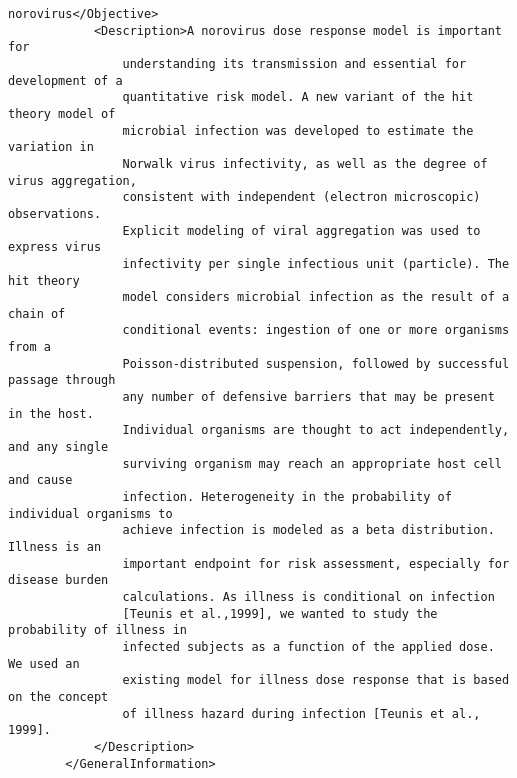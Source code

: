 \begin{lstlisting}[language=RAKIP, caption={Example of GenericModel}]
                norovirus</Objective>
            <Description>A norovirus dose response model is important for
                understanding its transmission and essential for development of a
                quantitative risk model. A new variant of the hit theory model of
                microbial infection was developed to estimate the variation in
                Norwalk virus infectivity, as well as the degree of virus aggregation,
                consistent with independent (electron microscopic) observations.
                Explicit modeling of viral aggregation was used to express virus
                infectivity per single infectious unit (particle). The hit theory
                model considers microbial infection as the result of a chain of
                conditional events: ingestion of one or more organisms from a
                Poisson-distributed suspension, followed by successful passage through
                any number of defensive barriers that may be present in the host.
                Individual organisms are thought to act independently, and any single
                surviving organism may reach an appropriate host cell and cause
                infection. Heterogeneity in the probability of individual organisms to
                achieve infection is modeled as a beta distribution. Illness is an
                important endpoint for risk assessment, especially for disease burden
                calculations. As illness is conditional on infection
                [Teunis et al.,1999], we wanted to study the probability of illness in
                infected subjects as a function of the applied dose. We used an
                existing model for illness dose response that is based on the concept
                of illness hazard during infection [Teunis et al., 1999].
            </Description>
        </GeneralInformation>


\end{lstlisting}
